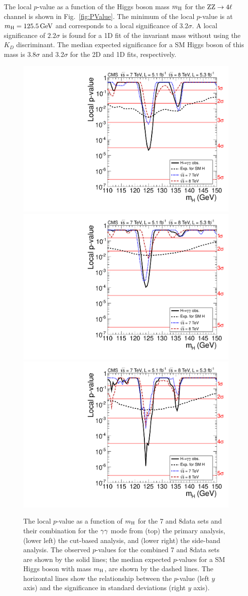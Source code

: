 \documentclass[12pt,twoside,a4paper,cmspaper,final,collab]{cms-tdr}
\begin{document}
The local $p$-value as a function of the Higgs boson mass $m_{\mathrm{H}}$
for the $\mathrm{Z}\mathrm{Z}   \rightarrow 4\ell$ channel
is shown in Fig.~\ref{fig:PValue}.
The minimum of the local $p$-value is at $m_{\mathrm{H}}=125.5\,\text{Ge\hspace{-.08em}V}$ and
corresponds to a local significance of $3.2\sigma$.
A local significance of $2.2\sigma$ is found for a  1D fit of the invariant mass without using the $K_{D}$ discriminant.
The median expected significance for a SM Higgs boson of this mass
is $3.8\sigma$ and 3.2$\sigma$ for the 2D and 1D fits, respectively.



\begin{figure}[htbp]
    \begin{center}
      \includegraphics[width=0.49\linewidth]{figures/hgg_MassFactPValue}  \\
      \includegraphics[width=0.49\linewidth]{figures/hgg_BaselinePValue}
      \includegraphics[width=0.49\linewidth]{figures/hgg_MassWindowPValue}
     \caption{The local $p$-value as a function of $m_{\mathrm{H}}$ for the 7 and 8\TeV data sets and their combination
      for the  $\gamma\gamma$ mode from
      (top) the primary analysis,
     (lower left) the cut-based analysis, and (lower right) the side-band analysis.
     The observed $p$-values for the combined 7 and 8\TeV data sets  are shown by the solid lines;
     the median expected $p$-values for a SM Higgs boson with mass $m_{\mathrm{H}}$, are shown by the dashed lines.
     The horizontal lines show the relationship between the $p$-value
     (left $y$ axis) and
     the significance in standard deviations (right $y$ axis).
       }
      \label{fig:PValueGaGa}
    \end{center}
\end{figure}
\end{document}
